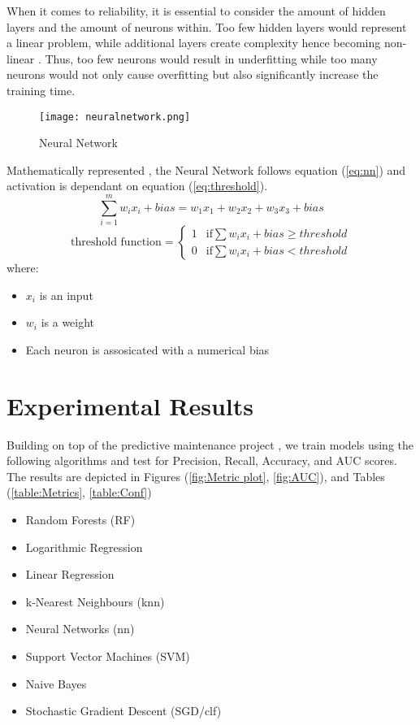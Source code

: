 When it comes to reliability, it is essential to consider the amount of hidden layers and the amount of neurons within.
Too few hidden layers would represent a linear problem, while additional layers create complexity hence becoming non-linear \cite{4618341}.
Thus, too few neurons would result in underfitting while too many neurons would not only cause overfitting but also significantly increase the training time.

\begin{figure}[h]
    \texttt{[image: neuralnetwork.png]}
    \centering
    \caption{Neural Network \cite{IBM-nn}}
    \label{fig:NN}
\end{figure}

\enlargethispage{-2\baselineskip}
Mathematically represented \cite{IBM-nn}, the Neural Network follows equation (\ref{eq:nn}) and activation is dependant on equation (\ref{eq:threshold}).
\begin{equation}
    \label{eq:nn}
    \sum^m_{i=1} w_ix_i + bias = w_1x_1 + w_2x_2 + w_3x_3 + bias
\end{equation}
\begin{equation}
    \label{eq:threshold}
    \text{threshold function} = \begin{cases}
        1 & \text{if} \sum w_ix_i + bias \geq threshold\\
        0 & \text{if} \sum w_ix_i + bias < threshold
    \end{cases}
\end{equation}
where:
\begin{itemize}
    \item $x_i$ is an input
    \item $w_i$ is a weight
    \item Each neuron is assosicated with a numerical bias
\end{itemize}

\section{Experimental Results}
Building on top of the predictive maintenance project \cite{ahonen}, we train models using the following algorithms and test for Precision, Recall, Accuracy, and AUC scores.
The results are depicted in Figures (\ref{fig:Metric plot}, \ref{fig:AUC}), and Tables (\ref{table:Metrics}, \ref{table:Conf})
\begin{itemize}
    \item Random Forests (RF)
    \item Logarithmic Regression
    \item Linear Regression
    \item k-Nearest Neighbours (knn)
    \item Neural Networks (nn)
    \item Support Vector Machines (SVM)
    \item Naive Bayes
    \item Stochastic Gradient Descent (SGD/clf)
\end{itemize}

